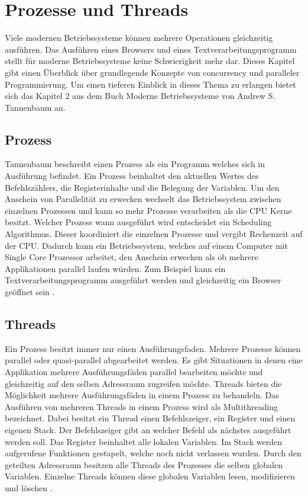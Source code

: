 \section{Prozesse und Threads}

Viele modernen Betriebssysteme können mehrere Operationen gleichzeitig ausführen. Das Ausführen eines Browsers und eines Textverarbeitungsprogramm stellt für moderne Betriebssysteme keine Schwierigkeit mehr dar. Dieses Kapitel gibt einen Überblick über grundlegende Konzepte von concurrency und paralleler Programmierung. Um einen tieferen Einblick in dieses Thema zu erlangen bietet sich das Kapitel 2 aus dem Buch Moderne Betriebssysteme von Andrew S. Tannenbaum an. 

\subsection{Prozess}
\label{section: Prozess}
Tannenbaum beschreibt einen Prozess als ein Programm welches sich in Ausführung befindet. Ein Prozess beinhaltet den aktuellen Wertes des Befehlszählers, die Registerinhalte und die Belegung der Variablen. Um den Anschein von Parallelität zu erwecken wechselt das Betriebssystem zwischen einzelnen Prozessen und kann so mehr Prozesse verarbeiten als die CPU Kerne besitzt. Welcher Prozess wann ausgeführt wird entscheidet ein Scheduling Algorithmus. Dieser koordiniert die einzelnen Prozesse und vergibt Rechenzeit auf der CPU. Dadurch kann ein Betriebssystem, welches auf einem Computer mit Single Core Prozessor arbeitet, den Anschein erwecken als ob mehrere Applikationen parallel laufen würden. Zum Beispiel kann ein Textverarbeitungsprogramm ausgeführt werden und gleichzeitig ein Browser geöffnet sein \cite[p. 87]{tan09}.

\subsection{Threads}
\label{section: Threads}
Ein Prozess besitzt immer nur einen Ausführungsfaden. Mehrere Prozesse können parallel oder quasi-parallel abgearbeitet werden. Es gibt Situationen in denen eine Applikation mehrere Ausführungsfäden parallel bearbeiten möchte und gleichzeitig auf den selben Adressraum zugreifen möchte. Threads bieten die Möglichkeit mehrere Ausführungsfäden in einem Prozess zu behandeln. Das Ausführen von mehreren Threads in einem Prozess wird als Multithreading bezeichnet. Dabei besitzt ein Thread einen Befehlszeiger, ein Register und einen eigenen Stack. Der Befehlszeiger gibt an welcher Befehl als nächstes ausgeführt werden soll. Das Register beinhaltet alle lokalen Variablen. Im Stack werden aufgerufene Funktionen gestapelt, welche noch nicht verlassen wurden. Durch den geteilten Adressraum besitzen alle Threads des Prozesses die selben globalen Variablen. Einzelne Threads können diese globalen Variablen lesen, modifizieren und löschen \cite[p. 97]{tan09}. 

